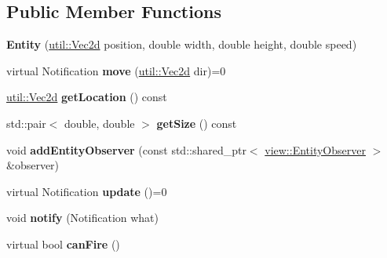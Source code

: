 \subsection*{Public Member Functions}
\begin{DoxyCompactItemize}
\item 
\mbox{\label{classmodel_1_1_entity_a8e515ce5ba8babadcf884794aea271eb}} 
{\bfseries Entity} (\mbox{\hyperlink{classutil_1_1_vec2}{util\+::\+Vec2d}} position, double width, double height, double speed)
\item 
\mbox{\label{classmodel_1_1_entity_adcc5e09753379e4024fd2ccb4519d6f3}} 
virtual Notification {\bfseries move} (\mbox{\hyperlink{classutil_1_1_vec2}{util\+::\+Vec2d}} dir)=0
\item 
\mbox{\label{classmodel_1_1_entity_af1386085e5f92a3ef79440f15501df0c}} 
\mbox{\hyperlink{classutil_1_1_vec2}{util\+::\+Vec2d}} {\bfseries get\+Location} () const
\item 
\mbox{\label{classmodel_1_1_entity_a0767f1130efdf98b0730e8980f7e9021}} 
std\+::pair$<$ double, double $>$ {\bfseries get\+Size} () const
\item 
\mbox{\label{classmodel_1_1_entity_a478f7f6633bbe6409114012f1d337435}} 
void {\bfseries add\+Entity\+Observer} (const std\+::shared\+\_\+ptr$<$ \mbox{\hyperlink{classview_1_1_entity_observer}{view\+::\+Entity\+Observer}} $>$ \&observer)
\item 
\mbox{\label{classmodel_1_1_entity_a852feba6aa621b2f8a85f35fe3a77d86}} 
virtual Notification {\bfseries update} ()=0
\item 
\mbox{\label{classmodel_1_1_entity_a33886fbf11fcda6b74156b55a6e389a4}} 
void {\bfseries notify} (Notification what)
\item 
\mbox{\label{classmodel_1_1_entity_a26455dbeac5d258fce6f4efd128814cb}} 
virtual bool {\bfseries can\+Fire} ()
\end{DoxyCompactItemize}
